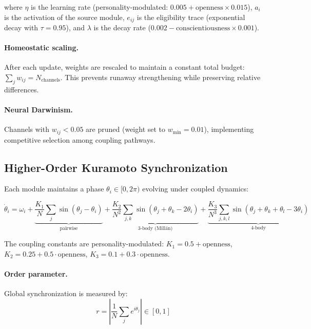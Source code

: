 \documentclass[11pt]{article}
\begin{document}
where $\eta$ is the learning rate (personality-modulated: $0.005 + \text{openness} \times 0.015$), $a_i$ is the activation of the source module, $e_{ij}$ is the eligibility trace (exponential decay with $\tau = 0.95$), and $\lambda$ is the decay rate ($0.002 - \text{conscientiousness} \times 0.001$).

\paragraph{Homeostatic scaling.} After each update, weights are rescaled to maintain a constant total budget: $\sum_j w_{ij} = N_{\text{channels}}$. This prevents runaway strengthening while preserving relative differences.

\paragraph{Neural Darwinism.} Channels with $w_{ij} < 0.05$ are pruned (weight set to $w_{\min} = 0.01$), implementing competitive selection among coupling pathways.

\subsection{Higher-Order Kuramoto Synchronization}
\label{sec:kuramoto}

Each module maintains a phase $\theta_i \in [0, 2\pi)$ evolving under coupled dynamics:

\begin{equation}
\dot{\theta}_i = \omega_i + \underbrace{\frac{K_1}{N}\sum_j \sin(\theta_j - \theta_i)}_{\text{pairwise}} + \underbrace{\frac{K_2}{N^2}\sum_{j,k} \sin(\theta_j + \theta_k - 2\theta_i)}_{\text{3-body (Mill\'an)}} + \underbrace{\frac{K_3}{N^3}\sum_{j,k,l} \sin(\theta_j + \theta_k + \theta_l - 3\theta_i)}_{\text{4-body}}
\label{eq:kuramoto}
\end{equation}

The coupling constants are personality-modulated: $K_1 = 0.5 + \text{openness}$, $K_2 = 0.25 + 0.5 \cdot \text{openness}$, $K_3 = 0.1 + 0.3 \cdot \text{openness}$.

\paragraph{Order parameter.} Global synchronization is measured by:
\begin{equation}
r = \left|\frac{1}{N}\sum_j e^{i\theta_j}\right| \in [0, 1]
\end{equation}
\end{document}
